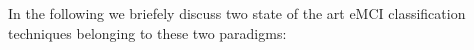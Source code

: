\documentclass[preprint,12pt]{elsarticle}
\begin{document}
In the following we briefely discuss two state of the art eMCI classification techniques belonging to these two paradigms:









\end{document}
